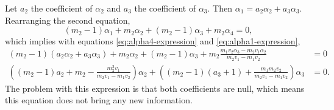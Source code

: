 \documentclass[a4paper, notitlepage, 11pt]{article}
\theoremstyle{definition}
\theoremstyle{remark}
\begin{document}
Let $a_2$ the coefficient of $\alpha_2$ and $a_3$ the coefficient of
$\alpha_3$. Then $\alpha_1 = a_2\alpha_2 + a_3\alpha_3$. Rearranging the second equation, 
$$
(m_2 - 1)\alpha_1 + m_2\alpha_2 + (m_2-1)\alpha_3 + m_2\alpha_4 = 0, 
$$
which implies with equations \eqref{eq:alpha4-expression} and \eqref{eq:alpha1-expression},
\begin{align}
  (m_2 - 1)(a_2\alpha_2 + a_3\alpha_3) + m_2\alpha_2 + (m_2 - 1)\alpha_3 + m_2\frac{m_1v_2\alpha_3 - m_2v_1\alpha_2}{m_2v_1 - m_1v_2} &= 0 \\
  \left((m_2-1)a_2 + m_2 - \frac{m_2^2v_1}{m_2v_1-m_1v_2}\right)\alpha_2 + \left((m_2-1)(a_3+1) + \frac{m_1m_2v_2}{m_2v_1-m_1v_2}\right)\alpha_3 &= 0. 
\end{align}
The problem with this expression is that both coefficients are null, which
means this equation does not bring any new information. 


 
\end{document}
